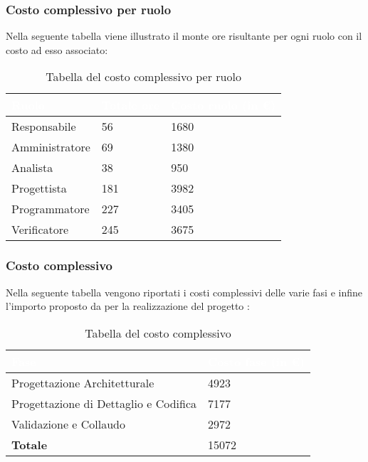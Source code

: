 \subsubsection{Costo complessivo per ruolo}
Nella seguente tabella viene illustrato il monte ore risultante per ogni ruolo con il costo ad esso associato:
{
\renewcommand{\arraystretch}{2}
\begin{longtable}{ C{3cm} C{2cm} C{4cm}}
\caption{Tabella del costo complessivo per ruolo}\\

\textcolor{white}{\textbf{Ruolo}} & 
\textcolor{white}{\textbf{Totale ore}} & 
\textcolor{white}{\textbf{Costo ruolo (in \euro{})}}\\	
\endhead
        
Responsabile   &  56 & 1680 \\
Amministratore &  69 & 1380 \\
Analista       &  38 &  950 \\
Progettista    & 181 & 3982 \\
Programmatore  & 227 & 3405 \\
Verificatore   & 245 & 3675 \\
        	
\end{longtable}
}

\subsubsection{Costo complessivo}
Nella seguente tabella vengono riportati i costi complessivi delle varie fasi e infine l'importo proposto da \Gruppo{} per la realizzazione del progetto \NomeProgetto{}:\\
{
\renewcommand{\arraystretch}{2}
\begin{longtable}{ C{5cm} C{5cm}}
\caption{Tabella del costo complessivo}\\

\textcolor{white}{\textbf{Fase}} &
\textcolor{white}{\textbf{Costo fase (in \euro{})}}\\	
\endhead
		
Progettazione Architetturale          &  4923 \\
Progettazione di Dettaglio e Codifica &  7177 \\
Validazione e Collaudo                &  2972 \\
\textbf{Totale}                       & 15072 \\

\end{longtable}
}